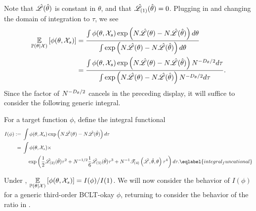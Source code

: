 Note that $\hat{\mathscr{L}}(\hat\theta)$ is constant in $\theta$, and that
$\hat{\mathscr{L}}_{(1)}(\hat\theta) = 0$.  Plugging in and changing the domain of
integration to $\tau$, we see
%
\begin{align*}
\underset{\mathbb{P}(\theta | {\mathcal{X}})}{\mathbb{E}}\left[\phi(\theta, {\mathcal{X}}_s)\right]
={}&
\frac{\int \phi(\theta, {\mathcal{X}}_s)
       \exp\left(
            N \hat{\mathscr{L}}(\theta) - N \hat{\mathscr{L}}(\hat\theta)
        \right)
       d \theta}
     {\int
     \exp\left(
        N \hat{\mathscr{L}}(\theta) - N \hat{\mathscr{L}}(\hat\theta)
     \right) d \theta}
\\={}&
\frac{\int \phi(\theta, {\mathcal{X}}_s)
       \exp\left(
            N \hat{\mathscr{L}}(\theta) - N \hat{\mathscr{L}}(\hat\theta)
        \right)
       N^{-D_\theta/2} d \tau}
     {\int
     \exp\left(
        N \hat{\mathscr{L}}(\theta) - N \hat{\mathscr{L}}(\hat\theta)
     \right) N^{-D_\theta/2} d \tau}.
\end{align*}
%
Since the factor of $N^{-D_\theta/2}$ cancels in the preceding display, it will suffice
to consider the following generic integral.
%
\begin{defn}
%
For a target function $\phi$, define the integral functional
%
\begin{align}
I(\phi) :={}&
\int \phi(\theta, \xvec_s)
   \exp\left(
       N \likhat(\theta) - N \likhat(\thetahat)
   \right)
   d \tau \\
={}&
\int \phi(\theta, \xvec_s) \times
\\&\quad
   \exp\left(
       \frac{1}{2} \likhatk{2}(\thetahat)\tau^2 +
       N^{-1/2} \frac{1}{6}\likhatk{3}(\thetahat) \tau^3 +
       N^{-1} \tresid{4}{\likhat, \thetahat, \theta} \tau^4
   \right)
   d \tau.
   \eqlabel{integral_funcational}
\end{align}
%
\end{defn}
%
Under , $\underset{\mathbb{P}(\theta | {\mathcal{X}})}{\mathbb{E}}\left[\phi(\theta, {\mathcal{X}}_s)\right] = I(\phi) /
I(1)$.  We will now consider the behavior of $I(\phi)$ for a
generic third-order BCLT-okay $\phi$,
returning to consider the behavior of the ratio in .
